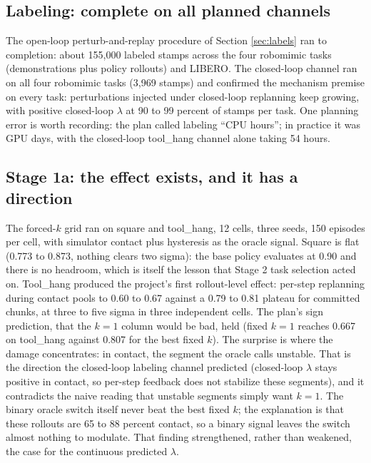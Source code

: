 \documentclass[11pt]{article}
\begin{document}
\subsection{Labeling: complete on all planned channels}

The open-loop perturb-and-replay procedure of Section \ref{sec:labels} ran to
completion: about 155{,}000 labeled stamps across the four robomimic tasks
(demonstrations plus policy rollouts) and LIBERO. The closed-loop channel ran
on all four robomimic tasks (3{,}969 stamps) and confirmed the mechanism
premise on every task: perturbations injected under closed-loop replanning keep
growing, with positive closed-loop $\lambda$ at 90 to 99 percent of stamps per
task. One planning error is worth recording: the plan called labeling ``CPU
hours''; in practice it was GPU days, with the closed-loop tool\_hang channel
alone taking 54 hours.

\subsection{Stage 1a: the effect exists, and it has a direction}

The forced-$k$ grid ran on square and tool\_hang, 12 cells, three seeds, 150
episodes per cell, with simulator contact plus hysteresis as the oracle
signal. Square is flat (0.773 to 0.873, nothing clears two sigma): the base
policy evaluates at 0.90 and there is no headroom, which is itself the lesson
that Stage 2 task selection acted on. Tool\_hang produced the project's first
rollout-level effect: per-step replanning during contact pools to 0.60 to 0.67
against a 0.79 to 0.81 plateau for committed chunks, at three to five sigma in
three independent cells. The plan's sign prediction, that the $k{=}1$ column
would be bad, held (fixed $k{=}1$ reaches 0.667 on tool\_hang against 0.807
for the best fixed $k$). The surprise is where the damage concentrates: in
contact, the segment the oracle calls unstable. That is the direction the
closed-loop labeling channel predicted (closed-loop $\lambda$ stays positive
in contact, so per-step feedback does not stabilize these segments), and it
contradicts the naive reading that unstable segments simply want $k{=}1$.
The binary oracle switch itself never beat the
best fixed $k$; the explanation is that these rollouts are 65 to 88 percent
contact, so a binary signal leaves the switch almost nothing to modulate. That
finding strengthened, rather than weakened, the case for the continuous
predicted $\lambda$.
\end{document}
